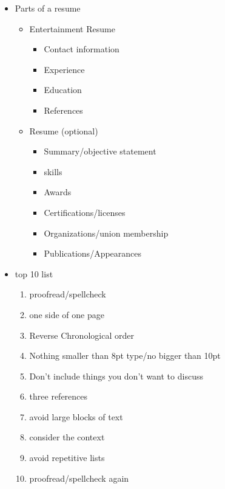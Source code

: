 \documentclass[12pt]{article}
\begin{document}
\begin{itemize}
                \item Parts of a resume
                \begin{itemize}
                    \item Entertainment Resume
                    \begin{itemize}
                        \item Contact information
                        \item Experience
                        \item Education
                        \item References
                    \end{itemize}
                    \item Resume (optional)
                    \begin{itemize}
                        \item Summary/objective statement
                        \item skills
                        \item Awards
                        \item Certifications/licenses
                        \item Organizations/union membership
                        \item Publications/Appearances
                    \end{itemize}
                \end{itemize}
                \newpage
                \item top 10 list
                \begin{enumerate}
                    \item proofread/spellcheck
                    \item one side of one page
                    \item Reverse Chronological order
                    \item Nothing smaller than 8pt type/no bigger than 10pt
                    \item Don't include things you don't want to discuss
                    \item three references
                    \item avoid large blocks of text
                    \item consider the context
                    \item avoid repetitive lists
                    \item proofread/spellcheck again
                \end{enumerate}
            \end{itemize}
        
\end{document}

